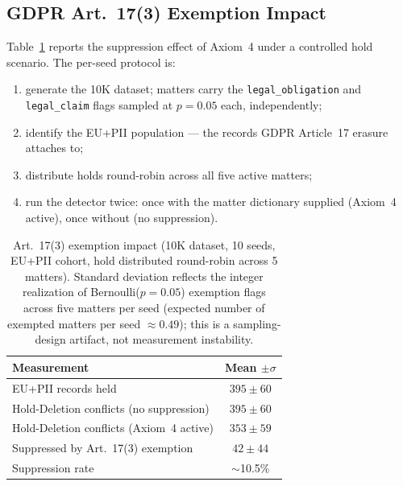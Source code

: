 \documentclass{ieeeaccess}
\begin{document}
\subsection{GDPR Art.~17(3) Exemption Impact}
\label{sec:exemption}

Table~\ref{tab:exemption} reports the suppression effect of Axiom~4 under a controlled hold scenario. The per-seed protocol is:
\begin{enumerate}
    \item generate the 10K dataset; matters carry the \texttt{legal\_obligation} and \texttt{legal\_claim} flags sampled at $p{=}0.05$ each, independently;
    \item identify the EU+PII population --- the records GDPR Article~17 erasure attaches to;
    \item distribute holds round-robin across all five active matters;
    \item run the detector twice: once with the matter dictionary supplied (Axiom~4 active), once without (no suppression).
\end{enumerate}

\begin{table}[t]
\centering
\caption{Art.~17(3) exemption impact (10K dataset, 10 seeds, EU+PII cohort, hold distributed round-robin across 5 matters). Standard deviation reflects the integer realization of Bernoulli($p{=}0.05$) exemption flags across five matters per seed (expected number of exempted matters per seed $\approx 0.49$); this is a sampling-design artifact, not measurement instability.}
\label{tab:exemption}
\begin{tabular}{lc}
\hline\hline
Measurement & Mean $\pm \sigma$ \\
\hline
EU+PII records held                              & $395 \pm 60$ \\
Hold-Deletion conflicts (no suppression)         & $395 \pm 60$ \\
Hold-Deletion conflicts (Axiom~4 active)         & $353 \pm 59$ \\
Suppressed by Art.~17(3) exemption               & $42 \pm 44$  \\
Suppression rate                                 & $\sim$10.5\%    \\
\hline\hline
\end{tabular}
\end{table}
\end{document}
